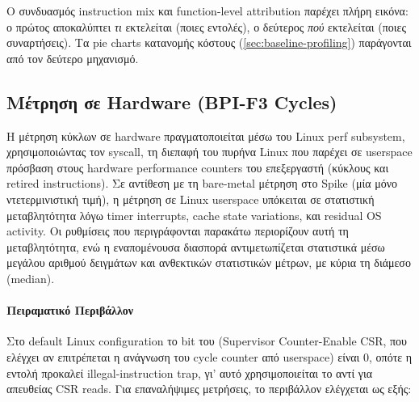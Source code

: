 \noindent
Ο συνδυασμός instruction mix και function-level attribution παρέχει πλήρη εικόνα:
ο πρώτος αποκαλύπτει \emph{τι} εκτελείται (ποιες εντολές), ο δεύτερος
\emph{πού} εκτελείται (ποιες συναρτήσεις). Τα pie charts κατανομής κόστους
(\cf \cref{sec:baseline-profiling}) παράγονται από τον δεύτερο μηχανισμό.

\subsection{Μέτρηση σε Hardware (BPI-F3 Cycles)}
\label{ssec:hw-measurement}

Η μέτρηση κύκλων σε hardware πραγματοποιείται μέσω του Linux perf
subsystem, χρησιμοποιώντας τον  syscall, τη 
διεπαφή του πυρήνα Linux που παρέχει σε userspace πρόσβαση στους 
hardware performance counters του επεξεργαστή (κύκλους και retired 
instructions). Σε αντίθεση
με τη bare-metal μέτρηση στο Spike (μία μόνο ντετερμινιστική τιμή), η μέτρηση
σε Linux userspace υπόκειται σε στατιστική μεταβλητότητα λόγω timer 
interrupts, cache state variations, και residual OS activity. Οι 
ρυθμίσεις που περιγράφονται παρακάτω περιορίζουν αυτή τη μεταβλητότητα, 
ενώ η εναπομένουσα διασπορά αντιμετωπίζεται στατιστικά μέσω μεγάλου 
αριθμού δειγμάτων και ανθεκτικών στατιστικών μέτρων, με κύρια τη διάμεσο (median).

\paragraph{Πειραματικό Περιβάλλον}

Στο default Linux configuration το bit  του  
(Supervisor Counter-Enable CSR, που ελέγχει αν επιτρέπεται η ανάγνωση 
του cycle counter από userspace) είναι 0, οπότε η εντολή  
προκαλεί illegal-instruction trap, γι' αυτό χρησιμοποιείται το 
 αντί για απευθείας CSR reads. Για επαναλήψιμες
μετρήσεις, το περιβάλλον ελέγχεται ως εξής:

